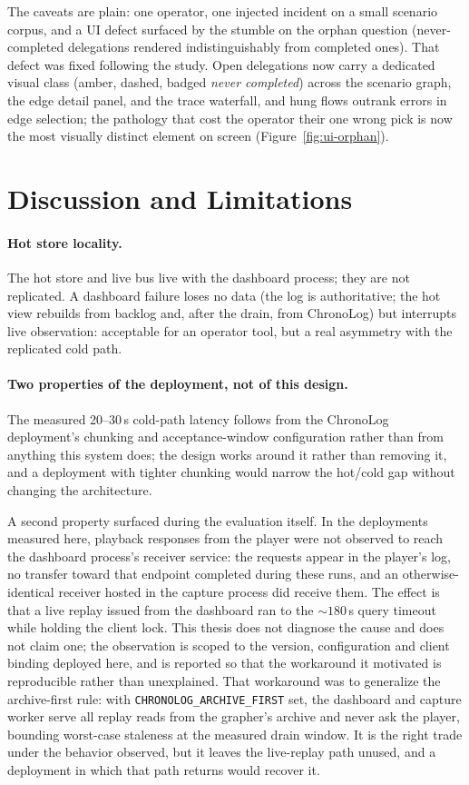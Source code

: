 The caveats are plain: one operator, one injected incident on a small
scenario corpus, and a
UI defect surfaced by the stumble on the orphan question (never-completed delegations
rendered indistinguishably from completed ones). That defect was fixed
following the study. Open delegations now carry a dedicated visual
class (amber, dashed, badged \emph{never completed}) across the
scenario graph, the edge detail panel, and the trace waterfall, and
hung flows outrank errors in edge selection; the pathology that cost
the operator their one wrong pick is now the most visually distinct
element on screen (Figure~\ref{fig:ui-orphan}).

\section{Discussion and Limitations}
\label{sec:eval-limitations}

\paragraph{Hot store locality.} The hot store and live bus live with the
dashboard process; they are not replicated. A dashboard failure loses no
data (the log is authoritative; the hot view rebuilds from backlog and,
after the drain, from ChronoLog) but interrupts live observation:
acceptable for an operator tool, but a real asymmetry with the
replicated cold path.

\paragraph{Two properties of the deployment, not of this design.} The
measured 20--30\,s cold-path latency follows from the ChronoLog
deployment's chunking and acceptance-window configuration rather than from
anything this system does; the design works around
it rather than removing it, and a deployment with tighter chunking would
narrow the hot/cold gap without changing the architecture.

A second property surfaced during the evaluation itself. In the
deployments measured here, playback responses from the player were not
observed to reach the dashboard process's receiver service: the requests
appear in the player's log, no transfer toward that endpoint completed
during these runs, and an otherwise-identical receiver hosted in the
capture process did receive them. The effect is that a live replay issued
from the dashboard ran to the ${\sim}180$\,s query timeout while holding
the client lock. This thesis does not diagnose the cause and does not
claim one; the observation is scoped to the version, configuration and
client binding deployed here, and is reported so that the workaround it
motivated is reproducible rather than unexplained. That workaround was to
generalize the archive-first
rule: with \texttt{CHRONOLOG\_ARCHIVE\_FIRST} set, the dashboard and
capture worker serve all replay reads from the grapher's archive and
never ask the player, bounding worst-case staleness at the measured
drain window. It is the right trade under the behavior observed, but it
leaves the live-replay path unused, and a deployment in which that path
returns would recover it.

